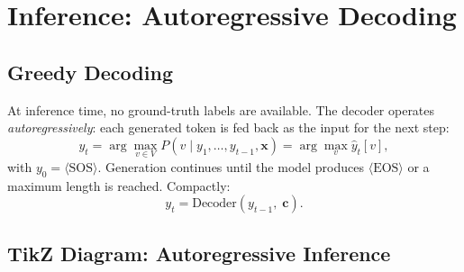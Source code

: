 \documentclass[12pt,a4paper]{article}
\begin{document}
\section{Inference: Autoregressive Decoding}
\label{sec:inference}

\subsection{Greedy Decoding}

At inference time, no ground-truth labels are available. The decoder operates
\emph{autoregressively}: each generated token is fed back as the input for the next step:
\begin{equation}
  y_t = \arg\max_{v \in V} P\!\left(v \mid y_1, \ldots, y_{t-1}, \mathbf{x}\right)
      = \arg\max_v \hat{y}_t[v],
  \label{eq:greedy}
\end{equation}
with $y_0 = \langle\text{SOS}\rangle$. Generation continues until the model produces
$\langle\text{EOS}\rangle$ or a maximum length is reached. Compactly:
\begin{equation}
  y_t = \text{Decoder}\!\left(y_{t-1},\; \mathbf{c}\right).
  \label{eq:autoregressive}
\end{equation}

\subsection{TikZ Diagram: Autoregressive Inference}
\label{subsec:autoregressive_diagram}
\end{document}
